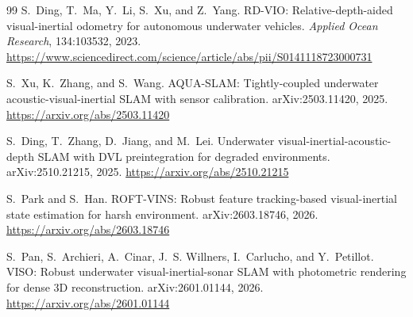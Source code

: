 \documentclass[11pt,a4paper]{article}
\begin{document}
\begin{thebibliography}{99}
S.~Ding, T.~Ma, Y.~Li, S.~Xu, and Z.~Yang.
\newblock RD-VIO: Relative-depth-aided visual-inertial odometry for autonomous underwater vehicles.
\newblock \textit{Applied Ocean Research}, 134:103532, 2023.
\newblock \url{https://www.sciencedirect.com/science/article/abs/pii/S0141118723000731}

S.~Xu, K.~Zhang, and S.~Wang.
\newblock AQUA-SLAM: Tightly-coupled underwater acoustic-visual-inertial SLAM with sensor calibration.
\newblock arXiv:2503.11420, 2025.
\newblock \url{https://arxiv.org/abs/2503.11420}

S.~Ding, T.~Zhang, D.~Jiang, and M.~Lei.
\newblock Underwater visual-inertial-acoustic-depth SLAM with DVL preintegration for degraded environments.
\newblock arXiv:2510.21215, 2025.
\newblock \url{https://arxiv.org/abs/2510.21215}

S.~Park and S.~Han.
\newblock ROFT-VINS: Robust feature tracking-based visual-inertial state estimation for harsh environment.
\newblock arXiv:2603.18746, 2026.
\newblock \url{https://arxiv.org/abs/2603.18746}

S.~Pan, S.~Archieri, A.~Cinar, J.~S. Willners, I.~Carlucho, and Y.~Petillot.
\newblock VISO: Robust underwater visual-inertial-sonar SLAM with photometric rendering for dense 3D reconstruction.
\newblock arXiv:2601.01144, 2026.
\newblock \url{https://arxiv.org/abs/2601.01144}

\end{thebibliography}
\end{document}
